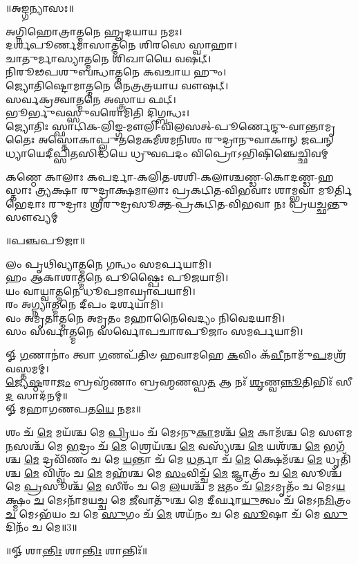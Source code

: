 \centerline{॥𑌅𑌙𑍍𑌗𑌨𑍍𑌯𑌾𑌸𑌃॥}
𑌅𑌗𑍍𑌨𑌿𑌹𑍋𑌤𑍍𑌰𑌾𑌤𑍍𑌮𑌨𑍇 𑌹𑍄𑌦𑌯𑌾𑌯 𑌨𑌮𑌃।\\
𑌦𑌰𑍍𑌶𑌪𑍂𑌰𑍍𑌣𑌮𑌾𑌸𑌾𑌤𑍍𑌮𑌨𑍇 𑌶𑌿𑌰𑌸𑍇 𑌸𑍍𑌵𑌾𑌹𑌾।\\
𑌚𑌾𑌤𑍁𑌰𑍍𑌮𑌾𑌸𑍍𑌯𑌾𑌤𑍍𑌮𑌨𑍇 𑌶𑌿𑌖𑌾𑌯𑍈 𑌵𑌷𑌟𑍍।\\
𑌨𑌿𑌰𑍂𑌢𑌪𑌶𑍁𑌬𑌨𑍍𑌧𑌾𑌤𑍍𑌮𑌨𑍇 𑌕𑌵𑌚𑌾𑌯 𑌹𑍁𑌂।\\
𑌜𑍍𑌯𑍋𑌤𑌿𑌷𑍍𑌟𑍋𑌮𑌾𑌤𑍍𑌮𑌨𑍇 𑌨𑍇𑌤𑍍𑌰𑌤𑍍𑌰𑌯𑌾𑌯 𑌵𑍗𑌷𑌟𑍍।\\
𑌸𑌰𑍍𑌵𑌕𑍍𑌰𑌤𑍍𑌵𑌾𑌤𑍍𑌮𑌨𑍇 𑌅𑌸𑍍𑌤𑍍𑌰𑌾𑌯 𑌫𑌟𑍍।\\
𑌭𑍂𑌰𑍍𑌭𑍁𑌵𑌸𑍍𑌸𑍁𑌵𑌰𑍋𑌮𑌿𑌤𑌿 𑌦𑌿𑌗𑍍𑌬𑌨𑍍𑌧𑌃।\\

\setlength{\shlokaspaceskip}{2pt}
{𑌜𑍍𑌯𑍋𑌤𑌿𑌃 𑌸𑍍𑌫𑌾𑌟𑌿𑌕-𑌲𑌿𑌙𑍍𑌗-𑌮𑍗𑌲𑌿-𑌵𑌿𑌲𑌸𑌤𑍍-𑌪𑍂𑌰𑍍𑌣𑍇𑌨𑍍𑌦𑍁-𑌵𑌾𑌨𑍍𑌤𑌾𑌮𑍃𑌤𑍈𑌃}
{𑌅𑌸𑍍𑌤𑍋𑌕𑌾𑌪𑍍𑌲𑍁𑌤𑌮𑍇𑌕𑌮𑍀𑌶𑌮𑌨𑌿𑌶𑌂 𑌰𑍁𑌦𑍍𑌰𑌾𑌨𑍁𑌵𑌾𑌕𑌾𑌨𑍍 𑌜𑌪𑌨𑍍}
{𑌧𑍍𑌯𑌾𑌯𑍇𑌦𑍀𑌪𑍍𑌸𑌿𑌤𑌸𑌿𑌦𑍍𑌧𑌯𑍇 𑌧𑍍𑌰𑍁𑌵𑌪𑌦𑌂 𑌵𑌿𑌪𑍍𑌰𑍋𑌽𑌭𑌿𑌷𑌿𑌞𑍍𑌚𑍇𑌚𑍍𑌛𑌿𑌵𑌮𑍍}

{𑌕𑌣𑍍𑌠𑍇 𑌕𑌾𑌲𑌾𑌃 𑌕𑌪𑌰𑍍𑌦𑌾-𑌕𑌲𑌿𑌤-𑌶𑌶𑌿-𑌕𑌲𑌾𑌶𑍍𑌚𑌣𑍍𑌡-𑌕𑍋𑌦𑌣𑍍𑌡-𑌹𑌸𑍍𑌤𑌾𑌃}
{𑌤𑍍𑌰𑍍𑌯𑌕𑍍𑌷𑌾 𑌰𑍁𑌦𑍍𑌰𑌾𑌕𑍍𑌷𑌮𑌾𑌲𑌾𑌃 𑌪𑍍𑌰𑌕𑌟𑌿𑌤-𑌵𑌿𑌭𑌵𑌾𑌃 𑌶𑌾𑌮𑍍𑌭𑌵𑌾 𑌮𑍂𑌰𑍍𑌤𑌿𑌭𑍇𑌦𑌾𑌃}
{𑌰𑍁𑌦𑍍𑌰𑌾𑌃 𑌶𑍍𑌰𑍀𑌰𑍁𑌦𑍍𑌰𑌸𑍂𑌕𑍍𑌤-𑌪𑍍𑌰𑌕𑌟𑌿𑌤-𑌵𑌿𑌭𑌵𑌾 𑌨𑌃 𑌪𑍍𑌰𑌯𑌚𑍍𑌛𑌨𑍍𑌤𑍁 𑌸𑍗𑌖𑍍𑌯𑌮𑍍}

\centerline{॥𑌪𑌞𑍍𑌚𑌪𑍂𑌜𑌾॥}

𑌲𑌂 𑌪𑍃𑌥𑌿𑌵𑍍𑌯𑌾𑌤𑍍𑌮𑌨𑍇 𑌗𑌨𑍍𑌧𑌂 𑌸𑌮𑌰𑍍𑌪𑌯𑌾𑌮𑌿।\\
𑌹𑌂 𑌆𑌕𑌾𑌶𑌾𑌤𑍍𑌮𑌨𑍇 𑌪𑍂𑌷𑍍𑌪𑍈𑌃 𑌪𑍂𑌜𑌯𑌾𑌮𑌿।\\
𑌯𑌂 𑌵𑌾𑌯𑍍𑌵𑌾𑌤𑍍𑌮𑌨𑍇 𑌧𑍂𑌪𑌮𑌾𑌘𑍍𑌰𑌾𑌪𑌯𑌾𑌮𑌿।\\
𑌰𑌂 𑌅𑌗𑍍𑌨𑍍𑌯𑌾𑌤𑍍𑌮𑌨𑍇 𑌦𑍀𑌪𑌂 𑌦𑌰𑍍𑌶𑌯𑌾𑌮𑌿।\\
𑌵𑌂 𑌅𑌮𑍃𑌤𑌾𑌤𑍍𑌮𑌨𑍇 𑌅𑌮𑍃𑌤𑌂 𑌮𑌹𑌾𑌨𑍈𑌵𑍇𑌦𑍍𑌯𑌂 𑌨𑌿𑌵𑍇𑌦𑌯𑌾𑌮𑌿।\\
𑌸𑌂 𑌸𑌰𑍍𑌵𑌾𑌤𑍍𑌮𑌨𑍇 𑌸𑌰𑍍𑌵𑍋𑌪𑌚𑌾𑌰𑌪𑍂𑌜𑌾𑌂 𑌸𑌮𑌰𑍍𑌪𑌯𑌾𑌮𑌿।

𑍐 \ul{𑌗}\-𑌣𑌾𑌨𑌾𑌂॑ 𑌤𑍍𑌵𑌾 \ul{𑌗}\-𑌣𑌪᳴𑌤𑌿𑍞 𑌹𑌵𑌾𑌮𑌹𑍇 \ul{𑌕}\-𑌵𑌿𑌂 𑌕᳴\-\ul{𑌵𑍀}\-𑌨𑌾𑌮𑍁᳴\-\ul{𑌪}\-\-𑌮𑌶𑍍𑌰᳴𑌵𑌸𑍍𑌤𑌮𑌮𑍍। \\
\-\ul{𑌜𑍍𑌯𑍇}\-\-\ul{𑌷𑍍𑌠}\-𑌰𑌾\-\ul{𑌜𑌂} 𑌬𑍍𑌰𑌹𑍍𑌮᳴𑌣𑌾𑌂 𑌬𑍍𑌰𑌹𑍍𑌮𑌣𑌸𑍍𑌪\-\ul{𑌤} 𑌆 𑌨𑌃᳴ \ul{𑌶𑍃}\-𑌣𑍍𑌵\-\ul{𑌨𑍍𑌨𑍂}\-𑌤𑌿𑌭𑌿𑌃᳴ 𑌸𑍀\-\ul{𑌦} 𑌸𑌾𑌦᳴𑌨𑌮𑍍॥ \\
𑍐 𑌮𑌹𑌾𑌗𑌣𑌪𑌤\-\ul{𑌯𑍇} 𑌨𑌮𑌃॥ 


𑌶𑌂 𑌚᳴ \ul{𑌮𑍇} 𑌮𑌯᳴𑌶𑍍𑌚 𑌮𑍇 \ul{𑌪𑍍𑌰𑌿}\-𑌯𑌂 𑌚᳴ 𑌮𑍇𑌽𑌨𑍁\-\ul{𑌕𑌾}\-𑌮𑌶𑍍𑌚᳴ \ul{𑌮𑍇} 𑌕𑌾𑌮᳴𑌶𑍍𑌚 𑌮𑍇 𑌸𑍗𑌮\-\ul{𑌨}\-𑌸𑌶𑍍𑌚᳴ 𑌮𑍇 \ul{𑌭}\-𑌦𑍍𑌰𑌂 𑌚᳴ \ul{𑌮𑍇} 𑌶𑍍𑌰𑍇𑌯᳴𑌶𑍍𑌚 \ul{𑌮𑍇} 𑌵𑌸𑍍𑌯᳴𑌶𑍍𑌚 \ul{𑌮𑍇} 𑌯𑌶᳴𑌶𑍍𑌚 \ul{𑌮𑍇} 𑌭𑌗᳴𑌶𑍍𑌚 \ul{𑌮𑍇} 𑌦𑍍𑌰𑌵𑌿᳴𑌣𑌂 𑌚 𑌮𑍇 \ul{𑌯}\-𑌨𑍍𑌤𑌾 𑌚᳴ 𑌮𑍇 \ul{𑌧}\-𑌰𑍍𑌤𑌾 𑌚᳴ \ul{𑌮𑍇} 𑌕𑍍𑌷𑍇𑌮᳴𑌶𑍍𑌚 \ul{𑌮𑍇} 𑌧𑍃𑌤𑌿᳴𑌶𑍍𑌚 \ul{𑌮𑍇} 𑌵𑌿𑌶𑍍𑌵𑌂᳴ 𑌚 \ul{𑌮𑍇} 𑌮𑌹᳴𑌶𑍍𑌚 𑌮𑍇 \ul{𑌸𑌂}\-𑌵𑌿𑌚𑍍𑌚᳴ \ul{𑌮𑍇} 𑌜𑍍𑌞𑌾𑌤𑍍𑌰𑌂᳴ 𑌚 \ul{𑌮𑍇} 𑌸𑍂𑌶𑍍𑌚᳴ 𑌮𑍇 \ul{𑌪𑍍𑌰}\-𑌸𑍂𑌶𑍍𑌚᳴ \ul{𑌮𑍇} 𑌸𑍀𑌰𑌂᳴ 𑌚 𑌮𑍇 \ul{𑌲}\-𑌯𑌶𑍍𑌚᳴ 𑌮 \ul{𑌋}\-𑌤𑌂 𑌚᳴ \ul{𑌮𑍇}\-𑌽𑌮𑍃𑌤𑌂᳴ 𑌚 𑌮𑍇𑌽\-\ul{𑌯}\-𑌕𑍍𑌷𑍍𑌮𑌂 \ul{𑌚} 𑌮𑍇𑌽𑌨𑌾᳴𑌮𑌯𑌚𑍍𑌚 𑌮𑍇 \ul{𑌜𑍀}\-𑌵𑌾𑌤𑍁᳴𑌶𑍍𑌚 𑌮𑍇 𑌦𑍀𑌰𑍍𑌘𑌾\-\ul{𑌯𑍁}\-𑌤𑍍𑌵𑌂 𑌚᳴ 𑌮𑍇𑌽𑌨\-\ul{𑌮𑌿}\-𑌤𑍍𑌰𑌂 \ul{𑌚} 𑌮𑍇𑌽𑌭᳴𑌯𑌂 𑌚 𑌮𑍇 \ul{𑌸𑍁}\-𑌗𑌂 𑌚᳴ \ul{𑌮𑍇} 𑌶𑌯᳴𑌨𑌂 𑌚 𑌮𑍇 \ul{𑌸𑍂}\-𑌷𑌾 𑌚᳴ 𑌮𑍇 \ul{𑌸𑍁}\-𑌦𑌿𑌨𑌂᳴ 𑌚 𑌮𑍇॥3॥ 
\centerline{॥𑍐 𑌶𑌾\-\ul{𑌨𑍍𑌤𑌿𑌃} 𑌶𑌾\-\ul{𑌨𑍍𑌤𑌿𑌃} 𑌶𑌾𑌨𑍍𑌤𑌿𑌃᳴॥}

